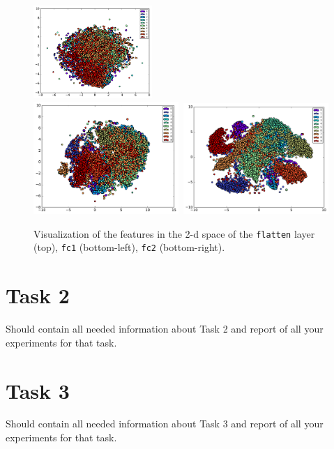 \documentclass{article}
\begin{document}
\begin{figure}[h!]
\centering
\includegraphics[width=0.4\textwidth]{visualization-linear-features_flatten.pdf}\\	
\includegraphics[width=0.49\textwidth]{visualization-linear-features_fc1.pdf}\	
\includegraphics[width=0.49\textwidth]{visualization-linear-features_fc2.pdf}
\caption{Visualization of the features in the 2-d space of the \texttt{flatten} layer (top), \texttt{fc1} (bottom-left), \texttt{fc2} (bottom-right).}
\label{fig:5}
\end{figure}



\section{Task 2}
Should contain all needed information about Task 2 and report of all your experiments for that task.





\section{Task 3}
Should contain all needed information about Task 3 and report of all your experiments for that task.
\end{document}
